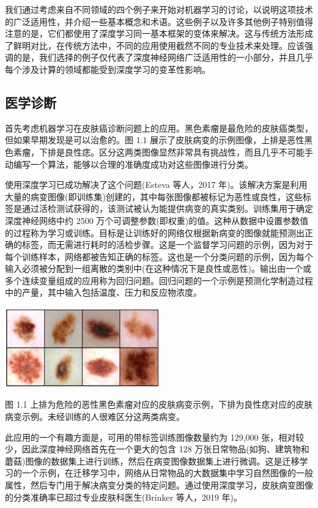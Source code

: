 \documentclass[10pt]{article}
\begin{document}
我们通过考虑来自不同领域的四个例子来开始对机器学习的讨论，以说明这项技术的广泛适用性，并介绍一些基本概念和术语。这些例子以及许多其他例子特别值得注意的是，它们都使用了深度学习同一基本框架的变体来解决。这与传统方法形成了鲜明对比，在传统方法中，不同的应用使用截然不同的专业技术来处理。应该强调的是，我们选择的例子仅代表了深度神经网络广泛适用性的一小部分，并且几乎每个涉及计算的领域都能受到深度学习的变革性影响。

\subsection{ 医学诊断}

首先考虑机器学习在皮肤癌诊断问题上的应用。黑色素瘤是最危险的皮肤癌类型，但如果早期发现是可以治愈的。图 1.1 展示了皮肤病变的示例图像，上排是恶性黑色素瘤，下排是良性痣。区分这两类图像显然非常具有挑战性，而且几乎不可能手动编写一个算法，能够以合理的准确度成功对这些图像进行分类。

使用深度学习已成功解决了这个问题(Esteva 等人，2017 年)。该解决方案是利用大量的病变图像(即训练集)创建的，其中每张图像都被标记为恶性或良性，这些标签是通过活检测试获得的，该测试被认为能提供病变的真实类别。训练集用于确定深度神经网络中约 2500 万个可调整参数(即权重)的值。这种从数据中设置参数值的过程称为学习或训练。目标是让训练好的网络仅根据新病变的图像就能预测出正确的标签，而无需进行耗时的活检步骤。这是一个监督学习问题的示例，因为对于每个训练样本，网络都被告知正确的标签。这也是一个分类问题的示例，因为每个输入必须被分配到一组离散的类别中(在这种情况下是良性或恶性)。输出由一个或多个连续变量组成的应用称为回归问题。回归问题的一个示例是预测化学制造过程中的产量，其中输入包括温度、压力和反应物浓度。

\begin{center}
\includegraphics[max width=0.5\textwidth]{images/0194e279-9b28-703a-88f4-c3ac21e2010d_21_871_1649_671_348_0.jpg}
\end{center}
\hspace*{3em} 

图 1.1 上排为危险的恶性黑色素瘤对应的皮肤病变示例，下排为良性痣对应的皮肤病变示例。未经训练的人很难区分这两类病变。

此应用的一个有趣方面是，可用的带标签训练图像数量约为 129,000 张，相对较少，因此深度神经网络首先在一个更大的包含 128 万张日常物品(如狗、建筑物和蘑菇)图像的数据集上进行训练，然后在病变图像数据集上进行微调。这是迁移学习的一个示例，在迁移学习中，网络从日常物品的大数据集中学习自然图像的一般属性，然后专门用于解决病变分类的特定问题。通过使用深度学习，皮肤病变图像的分类准确率已超过专业皮肤科医生(Brinker 等人，2019 年)。
\end{document}

